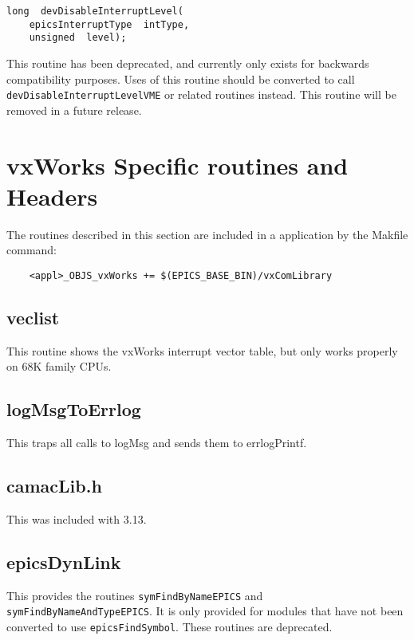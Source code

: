 \begin{verbatim}
long  devDisableInterruptLevel(
    epicsInterruptType  intType,
    unsigned  level);
\end{verbatim}

This routine has been deprecated, and currently only exists for backwards compatibility purposes. Uses of this routine 
should be converted to call \verb|devDisableInterruptLevelVME| or related routines instead. This routine will be 
removed in a future release.

\section{vxWorks Specific routines and Headers}

The routines described in this section are included in a application by the Makfile command:

\begin{verbatim}
    <appl>_OBJS_vxWorks += $(EPICS_BASE_BIN)/vxComLibrary
\end{verbatim}

\subsection{veclist}

This routine shows the vxWorks interrupt vector table, but only works properly on 68K family CPUs.

\subsection{logMsgToErrlog}

This traps all calls to logMsg and sends them to errlogPrintf.

\subsection{camacLib.h}

This was included with 3.13.

\subsection{epicsDynLink}

This provides the routines \verb|symFindByNameEPICS| and \verb|symFindByNameAndTypeEPICS|.
It is only provided for modules that have not been converted to use \verb|epicsFindSymbol|.
These routines are deprecated.


